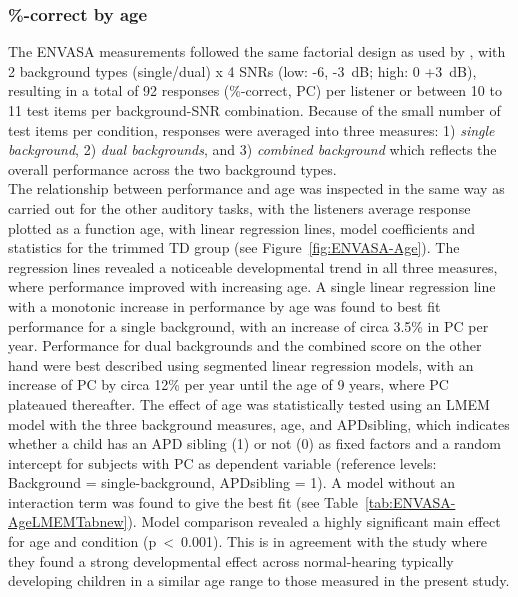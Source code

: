\documentclass[a4paper, twoside]{templates/ociamthesis}
\begin{document}
\hypertarget{correct-by-age}{%
\subsubsection*{\%-correct by age}\label{correct-by-age}}

The ENVASA measurements followed the same factorial design as used by \textcite{Leech2009}, with 2 background types (single/dual) x 4 SNRs (low: -6, -3~dB; high: 0 +3~dB), resulting in a total of 92 responses (\%-correct, PC) per listener or between 10 to 11 test items per background-SNR combination. Because of the small number of test items per condition, responses were averaged into three measures: 1) \emph{single background}, 2) \emph{dual backgrounds}, and 3) \emph{combined background} which reflects the overall performance across the two background types.\\

The relationship between performance and age was inspected in the same way as carried out for the other auditory tasks, with the listeners average response plotted as a function age, with linear regression lines, model coefficients and statistics for the trimmed TD group (see Figure~\ref{fig:ENVASA-Age}). The regression lines revealed a noticeable developmental trend in all three measures, where performance improved with increasing age. A single linear regression line with a monotonic increase in performance by age was found to best fit performance for a single background, with an increase of circa 3.5\% in PC per year. Performance for dual backgrounds and the combined score on the other hand were best described using segmented linear regression models, with an increase of PC by circa 12\% per year until the age of 9 years, where PC plateaued thereafter. The effect of age was statistically tested using an LMEM model with the three background measures, age, and APDsibling, which indicates whether a child has an APD sibling (1) or not (0) as fixed factors and a random intercept for subjects with PC as dependent variable (reference levels: Background = single-background, APDsibling = 1). A model without an interaction term was found to give the best fit (see Table~\ref{tab:ENVASA-AgeLMEMTabnew}). Model comparison revealed a highly significant main effect for age and condition (p~\textless~0.001). This is in agreement with the \textcite{Krishnan2013} study where they found a strong developmental effect across normal-hearing typically developing children in a similar age range to those measured in the present study.
\end{document}
